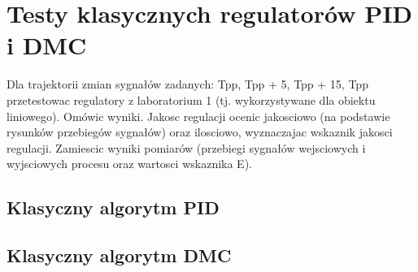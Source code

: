 \section{Testy klasycznych regulatorów PID i DMC}
\label{lab:zad3}

Dla trajektorii zmian sygnałów zadanych: Tpp, Tpp + 5, Tpp + 15, Tpp przetestowac
regulatory z laboratorium 1 (tj. wykorzystywane dla obiektu liniowego). Omówic wyniki.
Jakosc regulacji ocenic jakosciowo (na podstawie rysunków przebiegów sygnałów)
oraz ilosciowo, wyznaczajac wskaznik jakosci regulacji. Zamiescic wyniki pomiarów
(przebiegi sygnałów wejsciowych i wyjsciowych procesu oraz wartosci wskaznika E).

%    


\subsection{Klasyczny algorytm PID}
\label{lab:zad3:PID}


\newpage

\subsection{Klasyczny algorytm DMC}
\label{lab:zad3:DMC}



\newpage
